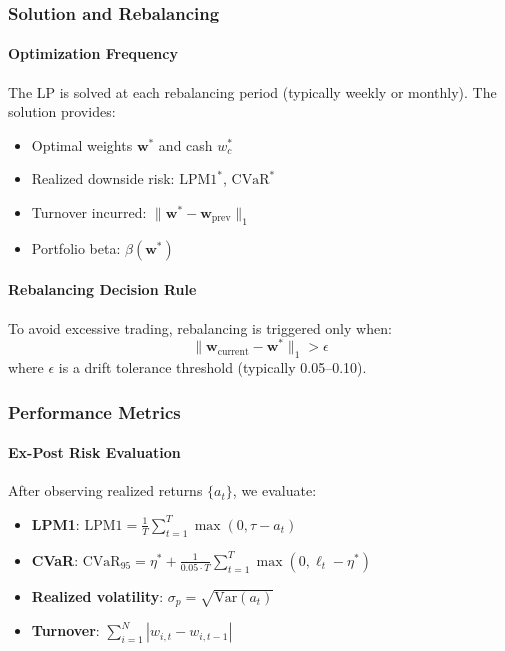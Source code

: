 \subsubsection{Solution and Rebalancing}

\paragraph{Optimization Frequency}

The LP is solved at each rebalancing period (typically weekly or monthly). The solution provides:
\begin{itemize}
  \item Optimal weights $\mathbf{w}^*$ and cash $w_c^*$
  \item Realized downside risk: $\text{LPM1}^*$, $\text{CVaR}^*$
  \item Turnover incurred: $\|\mathbf{w}^* - \mathbf{w}_{\text{prev}}\|_1$
  \item Portfolio beta: $\beta(\mathbf{w}^*)$
\end{itemize}

\paragraph{Rebalancing Decision Rule}

To avoid excessive trading, rebalancing is triggered only when:
\[
\|\mathbf{w}_{\text{current}} - \mathbf{w}^*\|_1 > \epsilon
\]
where $\epsilon$ is a drift tolerance threshold (typically 0.05--0.10).

\subsubsection{Performance Metrics}

\paragraph{Ex-Post Risk Evaluation}

After observing realized returns $\{a_t\}$, we evaluate:

\begin{itemize}
  \item \textbf{LPM1}: $\text{LPM1} = \frac{1}{T} \sum_{t=1}^T \max(0, \tau - a_t)$
  \item \textbf{CVaR}: $\text{CVaR}_{95} = \eta^* + \frac{1}{0.05 \cdot T} \sum_{t=1}^T \max(0, \ell_t - \eta^*)$
  \item \textbf{Realized volatility}: $\sigma_p = \sqrt{\text{Var}(a_t)}$
  \item \textbf{Turnover}: $\sum_{i=1}^N |w_{i,t} - w_{i,t-1}|$
\end{itemize}


